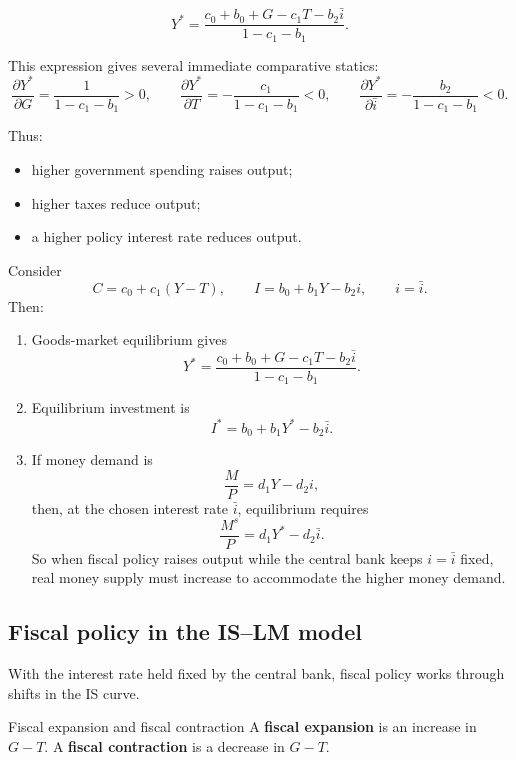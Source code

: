 \begin{keyformula}[title={Key Formula: Equilibrium output under interest-rate targeting}]
\[
Y^\ast
=
\frac{c_0+b_0+G-c_1T-b_2\bar{i}}{1-c_1-b_1}.
\]
\end{keyformula}

\noindent
This expression gives several immediate comparative statics:
\[
\frac{\partial Y^\ast}{\partial G}=\frac{1}{1-c_1-b_1}>0,
\qquad
\frac{\partial Y^\ast}{\partial T}=-\frac{c_1}{1-c_1-b_1}<0,
\qquad
\frac{\partial Y^\ast}{\partial \bar{i}}=-\frac{b_2}{1-c_1-b_1}<0.
\]

\noindent
Thus:
\begin{itemize}[leftmargin=1.5em]
\item higher government spending raises output;
\item higher taxes reduce output;
\item a higher policy interest rate reduces output.
\end{itemize}

\begin{examplebox}[title={Worked Example (Tutorial 3): Output, investment, and accommodating money supply}]
Consider
\[
C = c_0 + c_1(Y-T),
\qquad
I = b_0 + b_1Y - b_2 i,
\qquad
i=\bar{i}.
\]
Then:
\begin{enumerate}[leftmargin=1.5em,label=(\alph*)]
\item Goods-market equilibrium gives
\[
Y^\ast
=
\frac{c_0+b_0+G-c_1T-b_2\bar{i}}{1-c_1-b_1}.
\]
\item Equilibrium investment is
\[
I^\ast
=
b_0+b_1Y^\ast-b_2\bar{i}.
\]
\item If money demand is
\[
\frac{M}{P}=d_1Y-d_2 i,
\]
then, at the chosen interest rate $\bar{i}$, equilibrium requires
\[
\frac{M^s}{P}=d_1Y^\ast-d_2\bar{i}.
\]
So when fiscal policy raises output while the central bank keeps $i=\bar{i}$ fixed, real money supply must increase to accommodate the higher money demand.
\end{enumerate}
\end{examplebox}

\subsection{Fiscal policy in the IS--LM model}

With the interest rate held fixed by the central bank, fiscal policy works through shifts in the IS curve.

\begin{definition}{Fiscal expansion and fiscal contraction}{}
A \textbf{fiscal expansion} is an increase in $G-T$.
A \textbf{fiscal contraction} is a decrease in $G-T$.
\end{definition}

